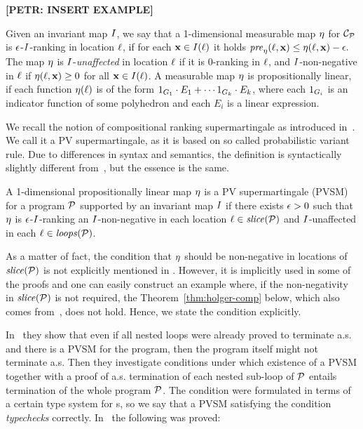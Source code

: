 \textbf{[PETR: INSERT EXAMPLE]}

Given an invariant map $I$, we say that a 1-dimensional measurable map $\eta$ for $\mathcal{C}_{\mathcal{P}}$ is $\epsilon$-$I$-ranking in location $\ell$, if for each $\mathbf{x}\in I(\ell)$  it holds $\mathit{pre}_{\eta}(\ell,\mathbf{x})\leq \eta(\ell,\mathbf{x})-\epsilon.$ The map $\eta$ is $I$-\emph{unaffected} in location $\ell$ if it is $0$-ranking in $\ell$, and $I$-non-negative in $\ell$ if $\eta(\ell,\mathbf{x})\geq 0$ for all $\mathbf{x} \in I(\ell)$. A measurable map $\eta$ is propositionally linear, if each function $\eta(\ell)$ is of the form ${1}_{G_1}\cdot E_1 + \cdots {1}_{G_k}\cdot E_k$, where each ${1}_{G_i}$ is an indicator function of some polyhedron and each $E_i$ is a linear expression.

We recall the notion of compositional ranking supermartingale as introduced in~\cite{HolgerPOPL}. We call it a PV supermartingale, as it is based on so called probabilistic variant rule. Due to differences in syntax and semantics, the definition is syntactically slightly different from~\cite{HolgerPOPL}, but the essence is the same. 

\begin{definition}
A 1-dimensional propositionally linear map $\eta$ is a PV supermartingale (PVSM) for a program $\mathcal{P}$ supported by an invariant map $I$ if there exists $\epsilon>0$ such that $\eta$ is $\epsilon$-$I$-ranking an $I$-non-negative in each location $\ell\in\mathit{slice}{(\mathcal{P})}$ and $I$-unaffected in each $\ell\in\mathit{loops}(\mathcal{P})$.
\end{definition}

As a matter of fact, the condition that $\eta$ should be non-negative in locations of $\mathit{slice}{(\mathcal{P})}$ is not explicitly mentioned in \cite{HolgerPOPL}. However, it is implicitly used in some of the proofs and one can easily construct an example where, if the non-negativity in $\mathit{slice}{(\mathcal{P})}$ is not required, the Theorem~\ref{thm:holger-comp} below, which also comes from~\cite{HolgerPOPL}, does not hold. Hence, we state the condition explicitly.

In~\cite{HolgerPOPL} they show that even if all nested loops were already proved to terminate a.s. and there is a PVSM for the program, then the program itself might not terminate a.s. Then they investigate conditions under which existence of a PVSM together with a proof of a.s. termination of each nested sub-loop of $\mathcal{P}$ entails termination of the whole program $\mathcal{P}$. The condition were formulated in terms of a certain type system for \PP{}s, so we say that a PVSM satisfying the condition \emph{typechecks} correctly. In~\cite{HolgerPOPL} the following was proved:


